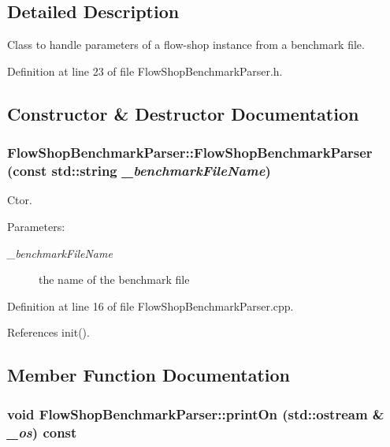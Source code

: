 \subsection{Detailed Description}
Class to handle parameters of a flow-shop instance from a benchmark file. 



Definition at line 23 of file Flow\-Shop\-Benchmark\-Parser.h.

\subsection{Constructor \& Destructor Documentation}
\subsubsection{\setlength{\rightskip}{0pt plus 5cm}Flow\-Shop\-Benchmark\-Parser::Flow\-Shop\-Benchmark\-Parser (const std::string {\em \_\-benchmark\-File\-Name})}\label{classFlowShopBenchmarkParser_2787b88a1be9d4d37438c557bf32f137}


Ctor. 

\begin{Desc}
\item[Parameters:]
\begin{description}
\item[{\em \_\-benchmark\-File\-Name}]the name of the benchmark file \end{description}
\end{Desc}


Definition at line 16 of file Flow\-Shop\-Benchmark\-Parser.cpp.

References init().

\subsection{Member Function Documentation}
\subsubsection{\setlength{\rightskip}{0pt plus 5cm}void Flow\-Shop\-Benchmark\-Parser::print\-On (std::ostream \& {\em \_\-os}) const}\label{classFlowShopBenchmarkParser_69c9ba47e774da4b06424a724573265d}


